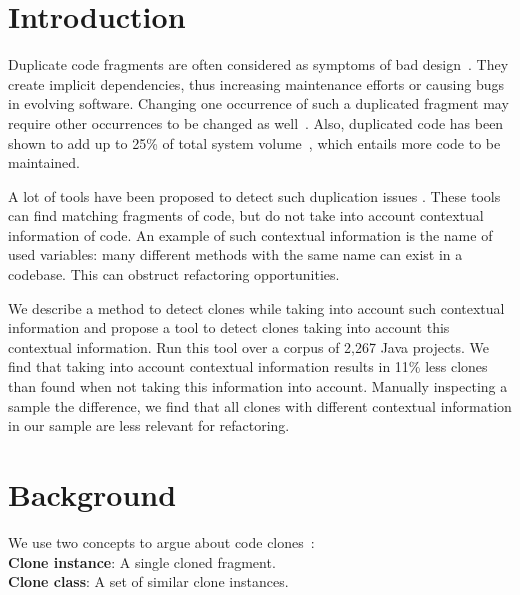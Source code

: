 \documentclass[conference]{IEEEtran}
\begin{document}
\section{Introduction}
Duplicate code fragments are often considered as symptoms of bad design~\cite{fowler2018refactoring}. They create implicit dependencies, thus increasing maintenance efforts or causing bugs in evolving software. Changing one occurrence of such a duplicated fragment may require other occurrences to be changed as well~\cite{ostberg2014automatically}. Also, duplicated code has been shown to add up to 25\% of total system volume~\cite{bruntink2005use}, which entails more code to be maintained.

A lot of tools have been proposed to detect such duplication issues \cite{roy2009comparison, svajlenko2014evaluating, sheneamer2016survey}. These tools can find matching fragments of code, but do not take into account contextual information of code. An example of such contextual information is the name of used variables: many different methods with the same name can exist in a codebase. This can obstruct refactoring opportunities.

We describe a method to detect clones while taking into account such contextual information and propose a tool to detect clones taking into account this contextual information. Run this tool over a corpus of 2,267 Java projects. We find that taking into account contextual information results in 11\% less clones than found when not taking this information into account. Manually inspecting a sample the difference, we find that all clones with different contextual information in our sample are less relevant for refactoring.

\section{Background}
We use two concepts to argue about code clones~\cite{roy2007survey}:
\\ \textbf{Clone instance}: A single cloned fragment.
\\ \textbf{Clone class}: A set of similar clone instances.
\end{document}
